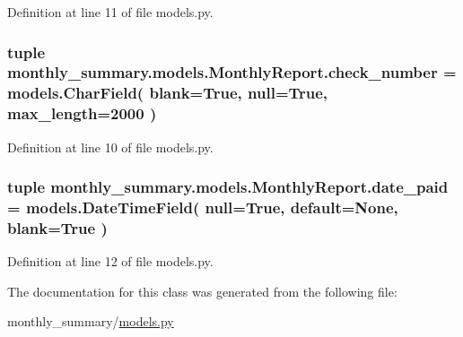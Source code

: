 Definition at line 11 of file models.\-py.

\hypertarget{classmonthly__summary_1_1models_1_1MonthlyReport_a84648435431842eca777a3b801ba0863}{
\subsubsection[{check\-\_\-number}]{\setlength{\rightskip}{0pt plus 5cm}tuple monthly\-\_\-summary.\-models.\-Monthly\-Report.\-check\-\_\-number = models.\-Char\-Field( blank=True, null=True, max\-\_\-length=2000 )\hspace{0.3cm}{\ttfamily [static]}}}\label{classmonthly__summary_1_1models_1_1MonthlyReport_a84648435431842eca777a3b801ba0863}


Definition at line 10 of file models.\-py.

\hypertarget{classmonthly__summary_1_1models_1_1MonthlyReport_ad9dba565d3c0962eb0279bb2c01e5d3d}{
\subsubsection[{date\-\_\-paid}]{\setlength{\rightskip}{0pt plus 5cm}tuple monthly\-\_\-summary.\-models.\-Monthly\-Report.\-date\-\_\-paid = models.\-Date\-Time\-Field( null=True, default=None, blank=True )\hspace{0.3cm}{\ttfamily [static]}}}\label{classmonthly__summary_1_1models_1_1MonthlyReport_ad9dba565d3c0962eb0279bb2c01e5d3d}


Definition at line 12 of file models.\-py.



The documentation for this class was generated from the following file\-:\begin{DoxyCompactItemize}
\item 
monthly\-\_\-summary/\hyperlink{monthly__summary_2models_8py}{models.\-py}\end{DoxyCompactItemize}
